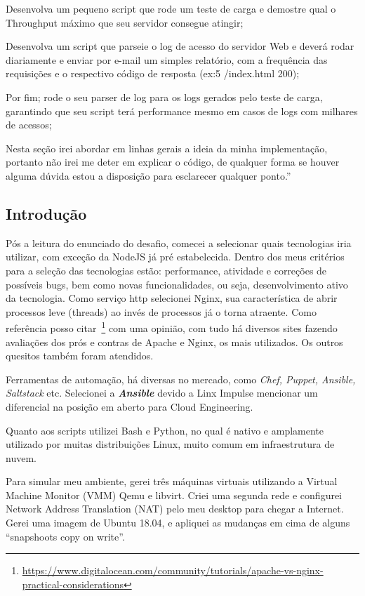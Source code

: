 Desenvolva um pequeno script que rode um teste de carga e demostre
qual o Throughput máximo que seu servidor consegue atingir; 

Desenvolva um script que parseie o log de acesso do servidor Web e
deverá rodar diariamente e enviar por e-mail um simples relatório, com
a frequência das requisições e o respectivo código de resposta (ex:5
/index.html 200); 

Por fim; rode o seu parser de log para os logs gerados pelo teste de
carga, garantindo que seu script terá performance mesmo em casos de
logs com milhares de acessos;

Nesta seção irei abordar em linhas gerais a ideia da minha
implementação, portanto não irei me deter em explicar o código, de
qualquer forma se houver alguma dúvida estou a disposição para
esclarecer qualquer ponto.''


\subsection{Introdução}
Pós a leitura do enunciado do desafio, comecei a selecionar quais
tecnologias iria utilizar, com exceção da NodeJS já pré
estabelecida. Dentro dos meus critérios para a seleção das tecnologias
estão: performance, atividade e correções de possíveis bugs, bem como
novas funcionalidades, ou seja, desenvolvimento ativo da tecnologia.
Como serviço http selecionei Nginx, sua característica de abrir
processos leve (threads) ao invés de processos já o torna
atraente. Como referência posso
citar~\footnote{\href{https://www.digitalocean.com/community/tutorials/apache-vs-nginx-practical-considerations}{https://www.digitalocean.com/community/tutorials/apache-vs-nginx-practical-considerations}}
com uma opinião, com tudo há diversos sites fazendo avaliações dos
prós e contras de Apache e Nginx, os mais utilizados. Os outros
quesitos também foram atendidos.

Ferramentas de automação, há diversas no mercado, como \emph{Chef, Puppet,
Ansible, Saltstack} etc. Selecionei a \emph{\textbf{Ansible}} devido a Linx Impulse
mencionar um diferencial na posição em aberto para Cloud Engineering.

Quanto aos scripts utilizei Bash e Python, no qual é nativo e
amplamente utilizado por muitas distribuições Linux, muito comum em
infraestrutura de nuvem.

Para simular meu ambiente, gerei três máquinas virtuais utilizando a
Virtual Machine Monitor (VMM) Qemu e libvirt. Criei uma segunda rede e
configurei Network Address Translation (NAT) pelo meu desktop para
chegar a Internet. Gerei uma imagem de Ubuntu 18.04, e apliquei as
mudanças em cima de alguns ``snapshoots copy on write''.

